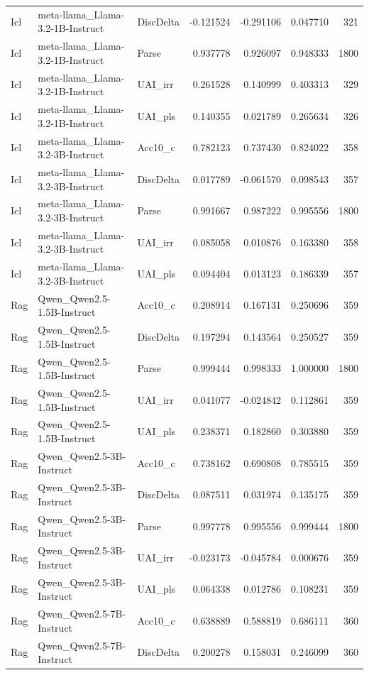 \begin{tabular}{lllrrrr}
Icl & meta-llama_Llama-3.2-1B-Instruct & DiscDelta & -0.121524 & -0.291106 & 0.047710 & 321 \\
Icl & meta-llama_Llama-3.2-1B-Instruct & Parse & 0.937778 & 0.926097 & 0.948333 & 1800 \\
Icl & meta-llama_Llama-3.2-1B-Instruct & UAI_irr & 0.261528 & 0.140999 & 0.403313 & 329 \\
Icl & meta-llama_Llama-3.2-1B-Instruct & UAI_pls & 0.140355 & 0.021789 & 0.265634 & 326 \\
Icl & meta-llama_Llama-3.2-3B-Instruct & Acc10_c & 0.782123 & 0.737430 & 0.824022 & 358 \\
Icl & meta-llama_Llama-3.2-3B-Instruct & DiscDelta & 0.017789 & -0.061570 & 0.098543 & 357 \\
Icl & meta-llama_Llama-3.2-3B-Instruct & Parse & 0.991667 & 0.987222 & 0.995556 & 1800 \\
Icl & meta-llama_Llama-3.2-3B-Instruct & UAI_irr & 0.085058 & 0.010876 & 0.163380 & 358 \\
Icl & meta-llama_Llama-3.2-3B-Instruct & UAI_pls & 0.094404 & 0.013123 & 0.186339 & 357 \\
Rag & Qwen_Qwen2.5-1.5B-Instruct & Acc10_c & 0.208914 & 0.167131 & 0.250696 & 359 \\
Rag & Qwen_Qwen2.5-1.5B-Instruct & DiscDelta & 0.197294 & 0.143564 & 0.250527 & 359 \\
Rag & Qwen_Qwen2.5-1.5B-Instruct & Parse & 0.999444 & 0.998333 & 1.000000 & 1800 \\
Rag & Qwen_Qwen2.5-1.5B-Instruct & UAI_irr & 0.041077 & -0.024842 & 0.112861 & 359 \\
Rag & Qwen_Qwen2.5-1.5B-Instruct & UAI_pls & 0.238371 & 0.182860 & 0.303880 & 359 \\
Rag & Qwen_Qwen2.5-3B-Instruct & Acc10_c & 0.738162 & 0.690808 & 0.785515 & 359 \\
Rag & Qwen_Qwen2.5-3B-Instruct & DiscDelta & 0.087511 & 0.031974 & 0.135175 & 359 \\
Rag & Qwen_Qwen2.5-3B-Instruct & Parse & 0.997778 & 0.995556 & 0.999444 & 1800 \\
Rag & Qwen_Qwen2.5-3B-Instruct & UAI_irr & -0.023173 & -0.045784 & 0.000676 & 359 \\
Rag & Qwen_Qwen2.5-3B-Instruct & UAI_pls & 0.064338 & 0.012786 & 0.108231 & 359 \\
Rag & Qwen_Qwen2.5-7B-Instruct & Acc10_c & 0.638889 & 0.588819 & 0.686111 & 360 \\
Rag & Qwen_Qwen2.5-7B-Instruct & DiscDelta & 0.200278 & 0.158031 & 0.246099 & 360 \\

\end{tabular}
